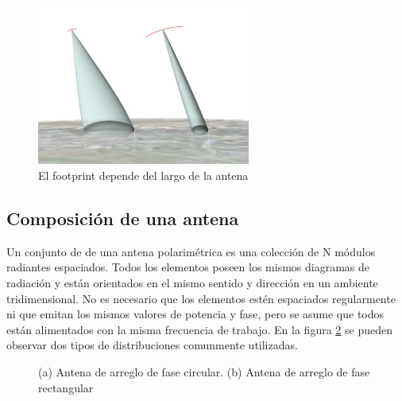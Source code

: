 \begin{figure}[H]
 \centering
 \includegraphics[width=7cm]{gfx/footprint.png}
 \caption{El footprint depende del largo de la antena}
 \label{fig:footprint}
\end{figure}

\subsection{Composición de una antena}

Un conjunto de de una antena polarimétrica es una colección de N módulos radiantes espaciados. Todos los elementos poseen los
mismos diagramas de radiación y están orientados en el mismo sentido y dirección en un ambiente tridimensional. No es 
necesario que los elementos estén espaciados regularmente ni que emitan los mismos valores de potencia y fase, pero se asume 
que todos están alimentados con la misma frecuencia de trabajo. En la figura \ref{fig:phasedArrayAntenna} se pueden observar
dos tipos de distribuciones comunmente utilizadas.

\begin{figure}[H]
	\centering
	\caption{ (a) Antena de arreglo de fase circular. (b) Antena de arreglo de fase rectangular}
	\label{fig:phasedArrayAntenna}
\end{figure}

